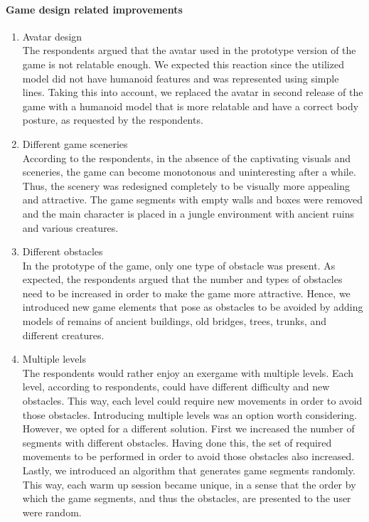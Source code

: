 \paragraph{Game design related improvements}
	\begin{enumerate}
		\item Avatar design\\
The respondents argued that the avatar used in the prototype version of the game is not relatable enough. We expected this reaction since the utilized model did not have humanoid features and was represented using simple lines. Taking this into account, we replaced the avatar in second release of the game with a humanoid model that is more relatable and have a correct body posture, as requested by the respondents.
\item Different game sceneries\\ 
According to the respondents, in the absence of the captivating visuals and sceneries, the game can become monotonous and uninteresting after a while. Thus, the scenery was redesigned completely to be visually more appealing and attractive. The game segments with empty walls and boxes were removed and the main character is placed in a jungle environment with ancient ruins and various creatures. 
\item Different obstacles\\
In the prototype of the game, only one type of obstacle was present.  As expected, the respondents argued that the number and types of obstacles need to be increased in order to make the game more attractive. Hence, we introduced new game elements that pose as obstacles to be avoided by adding models of remains of ancient buildings, old bridges, trees, trunks, and different creatures.  
\item Multiple levels\\
The respondents would rather enjoy an exergame with multiple levels. Each level, according to respondents, could have different difficulty and new obstacles. This way, each level could require new movements in order to avoid those obstacles. Introducing multiple levels was an option worth considering. However, we opted for a  different solution. First we increased the number of segments with different obstacles. Having done this, the set of required movements to be performed in order to avoid those obstacles also increased. Lastly, we introduced an algorithm that generates game segments randomly. This way, each warm up session became unique, in a sense that the order by which the game segments, and thus the obstacles, are presented to the user were random.  

\end{enumerate}
